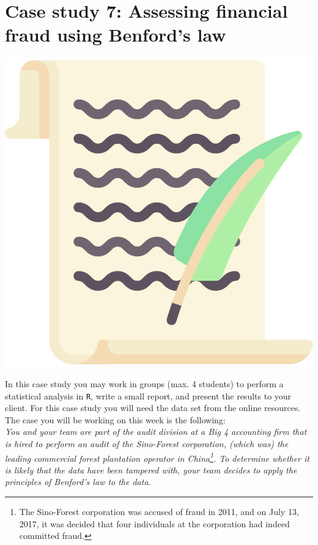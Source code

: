 
\begin{minipage}{0.8\textwidth}
\section{Case study 7: Assessing financial fraud using Benford's law}
\end{minipage}%
\hfill%
\begin{minipage}{0.1\textwidth}
\includegraphics[width=\linewidth]{Files/Images/lettericon.pdf}
\end{minipage}
\vspace*{.1cm}

In this case study you may work in groups (max. 4 students) to perform a statistical analysis in \texttt{R}, write a small report, and present the results to your client. For this case study you will need the data set  from the online resources. The case you will be working on this week is the following: \\

\textit{You and your team are part of the audit division at a Big 4 accounting firm that is hired to perform an audit of the Sino-Forest corporation, (which was) the leading commercial forest plantation operator in China\footnote{The Sino-Forest corporation was accused of fraud in 2011, and on July 13, 2017, it was decided that four individuals at the corporation had indeed committed fraud.}. To determine whether it is likely that the data have been tampered with, your team decides to apply the principles of Benford's law to the data.} \\


